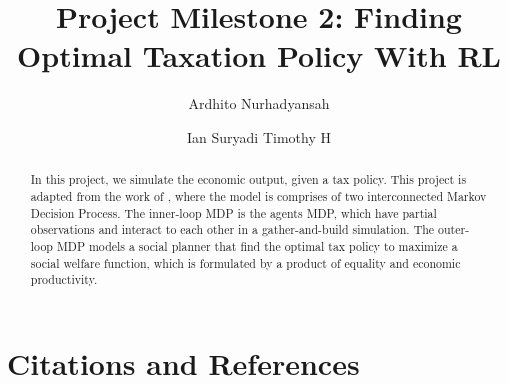 \documentclass{article}
\title{Project Milestone 2: Finding Optimal Taxation Policy With RL}
\author[1]{Ardhito Nurhadyansah}
\author[2]{Ian Suryadi Timothy H}
\affil[1]{2106750206}
\affil[2]{2106750875}
\begin{document}
\maketitle

\begin{abstract}
    In this project, we simulate the economic output, given a tax policy. This project is adapted from the work of \cite{zheng_2020_aieconomist}, where the model is comprises of two interconnected Markov Decision Process. The inner-loop MDP is the agents MDP, which have partial observations and interact to each other in a gather-and-build simulation. The outer-loop MDP models a social planner that find the optimal tax policy to maximize a social welfare function, which is formulated by a product of equality and economic productivity.
\end{abstract}
    






\section{Citations and References}


% 


\end{document}
